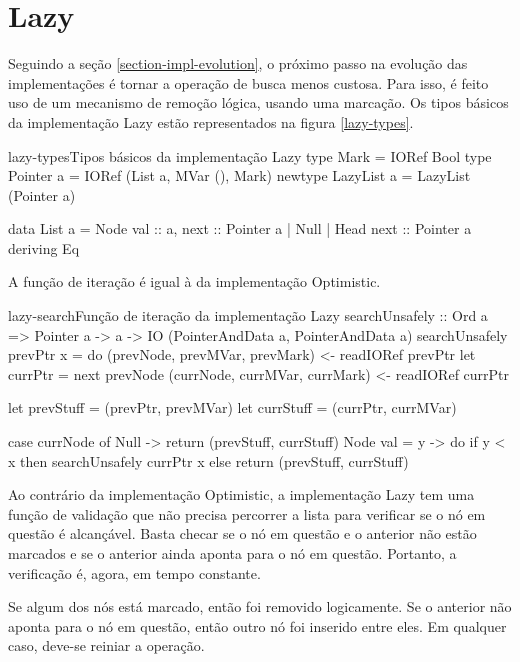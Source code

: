 \documentclass[a4paper,12pt,oldfontcommands]{abntex2}
\begin{document}
\section{Lazy}

Seguindo a seção \ref{section-impl-evolution}, o próximo passo na evolução das implementações é tornar a operação de busca menos custosa. Para isso, é feito uso de um mecanismo de remoção lógica, usando uma marcação. Os tipos básicos da implementação Lazy estão representados na figura \ref{lazy-types}.

\begin{code}{lazy-types}{Tipos básicos da implementação Lazy}
type Mark = IORef Bool
type Pointer a = IORef (List a, MVar (), Mark)
newtype LazyList a = LazyList (Pointer a)

data List a = Node { val :: a, next :: Pointer a }
    | Null
    | Head { next :: Pointer a }
    deriving Eq
\end{code}

A função de iteração é igual à da implementação Optimistic.

\begin{code}{lazy-search}{Função de iteração da implementação Lazy}
searchUnsafely :: Ord a => Pointer a -> a -> IO (PointerAndData a, PointerAndData a)
searchUnsafely prevPtr x = do
    (prevNode, prevMVar, prevMark) <- readIORef prevPtr
    let currPtr = next prevNode
    (currNode, currMVar, currMark) <- readIORef currPtr

    let prevStuff = (prevPtr, prevMVar)
    let currStuff = (currPtr, currMVar)

    case currNode of
        Null -> return (prevStuff, currStuff)
        Node { val = y } -> do
            if y < x then searchUnsafely currPtr x
            else return (prevStuff, currStuff)
\end{code}

Ao contrário da implementação Optimistic, a implementação Lazy tem uma função de validação que não precisa percorrer a lista para verificar se o nó em questão é alcançável. Basta checar se o nó em questão e o anterior não estão marcados e se o anterior ainda aponta para o nó em questão. Portanto, a verificação é, agora, em tempo constante.

Se algum dos nós está marcado, então foi removido logicamente. Se o anterior não aponta para o nó em questão, então outro nó foi inserido entre eles. Em qualquer caso, deve-se reiniar a operação.

\end{document}
